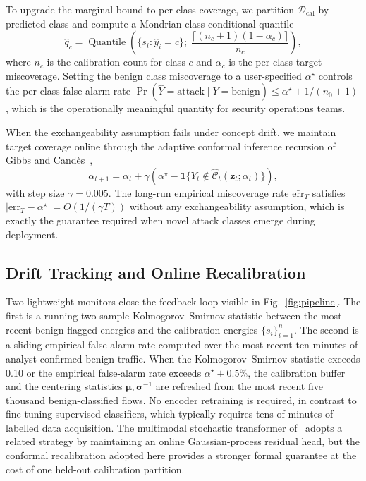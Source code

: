 \documentclass{ieeeaccess}
\DeclareMathOperator{\Quantile}{Quantile}
\begin{document}
To upgrade the marginal bound to per-class coverage, we partition
$\mathcal{D}_\text{cal}$ by predicted class and compute a Mondrian
class-conditional quantile
\begin{equation}
\hat{q}_c = \Quantile\!\left(\{s_i : \hat{y}_i = c\};\; \frac{\lceil(n_c+1)(1-\alpha_c)\rceil}{n_c}\right),
\label{eq:mondrian}
\end{equation}
where $n_c$ is the calibration count for class $c$ and $\alpha_c$ is the
per-class target miscoverage. Setting the benign class miscoverage to a
user-specified $\alpha^\star$ controls the per-class false-alarm rate
$\Pr(\hat{Y}=\text{attack}\mid Y=\text{benign}) \le \alpha^\star + 1/(n_0+1)$,
which is the operationally meaningful quantity for security operations
teams.

When the exchangeability assumption fails under concept drift, we maintain
target coverage online through the adaptive conformal inference recursion
of Gibbs and Cand\`{e}s~\cite{gibbs2021aci},
\begin{equation}
\alpha_{t+1} = \alpha_t + \gamma\!\left(\alpha^\star - \mathbf{1}\!\{Y_t \notin \hat{\mathcal{C}}_t(\mathbf{z}_t;\alpha_t)\}\right),
\label{eq:aci}
\end{equation}
with step size $\gamma = 0.005$. The long-run empirical miscoverage rate
$\bar{\mathrm{err}}_T$ satisfies
$|\bar{\mathrm{err}}_T - \alpha^\star| = O(1/(\gamma T))$ without any
exchangeability assumption, which is exactly the guarantee required when
novel attack classes emerge during deployment.

\subsection{Drift Tracking and Online Recalibration}
\label{sec:method:drift}
Two lightweight monitors close the feedback loop visible in
Fig.~\ref{fig:pipeline}. The first is a running two-sample
Kolmogorov--Smirnov statistic between the most recent benign-flagged
energies and the calibration energies $\{s_i\}_{i=1}^n$. The second is a
sliding empirical false-alarm rate computed over the most recent ten
minutes of analyst-confirmed benign traffic. When the
Kolmogorov--Smirnov statistic exceeds 0.10 or the empirical false-alarm
rate exceeds $\alpha^\star + 0.5\%$, the calibration buffer and the
centering statistics $\bm{\mu}, \bm{\sigma}^{-1}$ are refreshed from the
most recent five thousand benign-classified flows. No encoder retraining
is required, in contrast to fine-tuning supervised classifiers, which
typically requires tens of minutes of labelled data acquisition. The
multimodal stochastic transformer of~\cite{anaedevha2025stochmm} adopts a
related strategy by maintaining an online Gaussian-process residual head,
but the conformal recalibration adopted here provides a stronger formal
guarantee at the cost of one held-out calibration partition.
\end{document}
